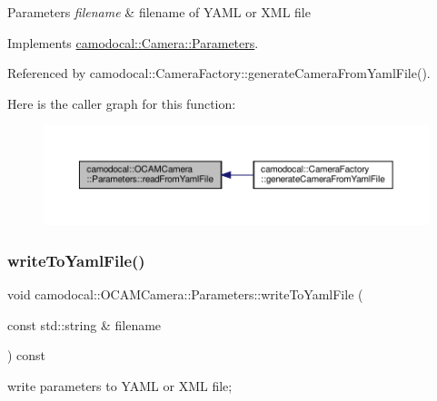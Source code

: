 \begin{DoxyParams}{Parameters}
{\em filename} & filename of Y\+A\+ML or X\+ML file \\
\hline
\end{DoxyParams}


Implements \hyperlink{classcamodocal_1_1Camera_1_1Parameters_a7968503df2a99e022a0c52bf7dafe531}{camodocal\+::\+Camera\+::\+Parameters}.



Referenced by camodocal\+::\+Camera\+Factory\+::generate\+Camera\+From\+Yaml\+File().

Here is the caller graph for this function\+:\nopagebreak
\begin{figure}[H]
\begin{center}
\leavevmode
\includegraphics[width=350pt]{classcamodocal_1_1OCAMCamera_1_1Parameters_a4cf20a66d7f4e9daf84fec3a83a6c458_icgraph}
\end{center}
\end{figure}
\mbox{\label{classcamodocal_1_1OCAMCamera_1_1Parameters_a3244c89711d0195540042c3700992827}} 
\subsubsection{\texorpdfstring{write\+To\+Yaml\+File()}{writeToYamlFile()}}
{\footnotesize\ttfamily void camodocal\+::\+O\+C\+A\+M\+Camera\+::\+Parameters\+::write\+To\+Yaml\+File (\begin{DoxyParamCaption}\item[{const std\+::string \&}]{filename }\end{DoxyParamCaption}) const\hspace{0.3cm}{\ttfamily [virtual]}}



write parameters to Y\+A\+ML or X\+ML file; 


